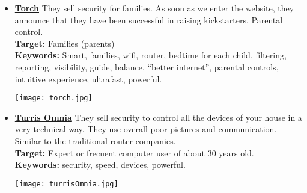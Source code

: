 \begin{itemize}
	\item \href{https://mytorch.com/}{\textbf{Torch}} They sell security for families. As soon as we enter the website, they announce that they have been successful in raising kickstarters. Parental control.\\
	\textbf{Target:} Families (parents)\\
	\textbf{Keywords:} Smart, families, wifi, router, bedtime for each child, filtering, reporting, visibility, guide, balance, “better internet”, parental controls, intuitive experience, ultrafast, powerful.\\
	\begin{center}
		\texttt{[image: torch.jpg]}
	\end{center}
	\newpage
	\item \href{https://omnia.turris.cz/en/#features}{\textbf{Turris Omnia}} They sell security to control all the devices of your house in a very technical way. They use overall poor pictures and communication. Similar to the traditional router companies.\\
	\textbf{Target:} Expert or frecuent computer user of about 30 years old.\\
	\textbf{Keywords:} security, speed, devices, powerful.\\
	\begin{center}
		\texttt{[image: turrisOmnia.jpg]}
	\end{center}
	

\end{itemize}
